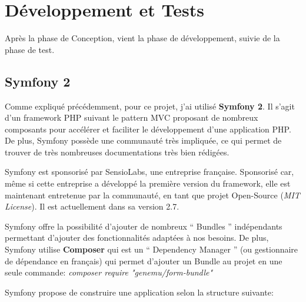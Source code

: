 \section{Développement et Tests}

Après la phase de Conception, vient la phase de développement, suivie de la phase de test.

\subsection{Symfony 2}

Comme expliqué précédemment, pour ce projet, j'ai utilisé \textbf{Symfony 2}. Il s'agit d'un framework PHP suivant le pattern MVC proposant de nombreux composants pour accélérer et faciliter le développement d'une application PHP. De plus, Symfony possède une communauté très impliquée, ce qui permet de trouver de très nombreuses documentations très bien rédigées.

Symfony est sponsorisé par SensioLabs, une entreprise française. Sponsorisé car, même si cette entreprise a développé la première version du framework, elle est maintenant entretenue par la communauté, en tant que projet Open-Source (\textit{MIT License}). Il est actuellement dans sa version 2.7.

Symfony offre la possibilité d'ajouter de nombreux `` Bundles '' indépendants permettant d'ajouter des fonctionnalités adaptées à nos besoins. De plus, Symfony utilise \textbf{Composer} qui est un `` Dependency Manager '' (ou gestionnaire de dépendance en français) qui permet d'ajouter un Bundle au projet en une seule commande: \textit{composer require "genemu/form-bundle"}

Symfony propose de construire une application selon la structure suivante:

